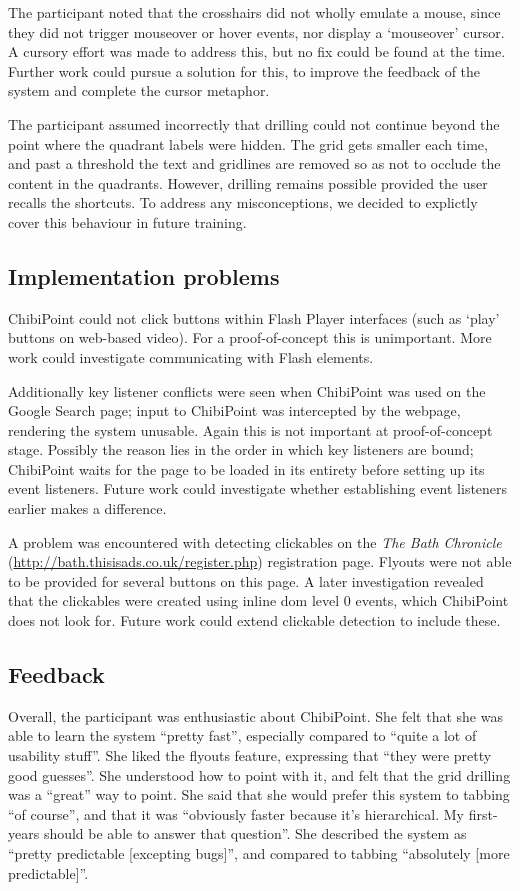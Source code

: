 \documentclass[a4paper, 12pt]{report}
\begin{document}
The participant noted that the crosshairs did not wholly emulate a mouse, since they did not trigger mouseover or hover events, nor display a `mouseover' cursor. A cursory effort was made to address this, but no fix could be found at the time. Further work could pursue a solution for this, to improve the feedback of the system and complete the cursor metaphor.

The participant assumed incorrectly that drilling could not continue beyond the point where the quadrant labels were hidden. The grid gets smaller each time, and past a threshold the text and gridlines are removed so as not to occlude the content in the quadrants. However, drilling remains possible provided the user recalls the shortcuts. To address any misconceptions, we decided to explictly cover this behaviour in future training.

\subsection{Implementation problems}
ChibiPoint could not click buttons within Flash Player interfaces (such as `play' buttons on web-based video). For a proof-of-concept this is unimportant. More work could investigate communicating with Flash elements.

Additionally key listener conflicts were seen when ChibiPoint was used on the Google Search page; input to ChibiPoint was intercepted by the webpage, rendering the system unusable. Again this is not important at proof-of-concept stage. Possibly the reason lies in the order in which key listeners are bound; ChibiPoint waits for the page to be loaded in its entirety before setting up its event listeners. Future work could investigate whether establishing event listeners earlier makes a difference.

A problem was encountered with detecting clickables on the \textit{The Bath Chronicle} (\url{http://bath.thisisads.co.uk/register.php}) registration page. Flyouts were not able to be provided for several buttons on this page. A later investigation revealed that the clickables were created using inline \gls{dom} level 0 events, which ChibiPoint does not look for. Future work could extend clickable detection to include these.

\subsection{Feedback}
\label{sec:usability_feedback}
Overall, the participant was enthusiastic about ChibiPoint. She felt that she was able to learn the system ``pretty fast'', especially compared to ``quite a lot of usability stuff''. She liked the flyouts feature, expressing that ``they were pretty good guesses''. She understood how to point with it, and felt that the grid drilling was a ``great'' way to point. She said that she would prefer this system to tabbing ``of course'', and that it was ``obviously faster because it's hierarchical. My first-years should be able to answer that question''. She described the system as ``pretty predictable [excepting bugs]'', and compared to tabbing ``absolutely [more predictable]''.
\end{document}
